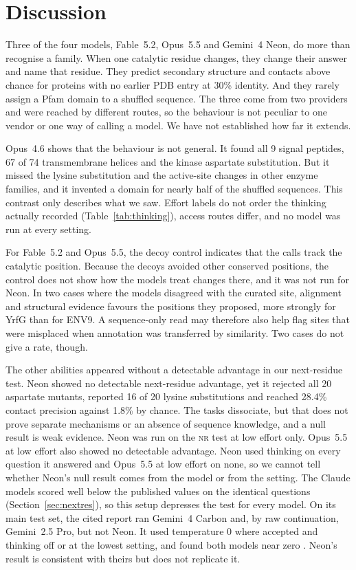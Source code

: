 \documentclass[11pt]{article}
\newcommand{\tnr}{\textmd{\textsc{nr}}}\newcommand{\tfeat}{\textmd{\textsc{feat}}}
\begin{document}
\FloatBarrier
\section{Discussion}

Three of the four models, Fable~5.2, Opus~5.5 and Gemini~4 Neon, do more than recognise a family. When one
catalytic residue changes, they change their answer and name that residue. They predict secondary
structure and contacts above chance for proteins with no earlier PDB entry at 30\% identity. And they
rarely assign a Pfam domain to a shuffled sequence. The three come from two providers and were reached by different
routes, so the behaviour is not peculiar to one vendor or one way of calling a model. We have not
established how far it extends.

Opus~4.6 shows that the behaviour is not general. It found all 9 signal peptides, 67
of 74 transmembrane helices and the kinase aspartate substitution. But it missed the lysine substitution
and the active-site changes in other enzyme families, and it invented a domain for nearly half of the
shuffled sequences. This contrast only describes what we
saw. Effort labels do not order the thinking actually recorded (Table~\ref{tab:thinking}), access routes
differ, and no model was run at every setting.

For Fable~5.2 and Opus~5.5, the decoy control indicates that the calls track the catalytic position.
Because the decoys avoided other conserved positions, the control does not show how the models treat
changes there, and it was not run for Neon. In two cases where the models disagreed with the curated
site, alignment and structural evidence favours the positions they proposed, more strongly for YrfG than
for ENV9. A sequence-only read may therefore also help flag sites that were misplaced when annotation was
transferred by similarity. Two cases do not give a rate, though.

The other abilities appeared without a detectable advantage in our next-residue test. Neon showed no
detectable next-residue advantage, yet it rejected all 20 aspartate mutants, reported 16 of 20 lysine
substitutions and reached 28.4\% contact precision against 1.8\% by chance. The tasks dissociate, but
that does not prove separate mechanisms or an absence of sequence knowledge, and a null result is weak
evidence. Neon was run on the \tnr{} test at low effort only. Opus~5.5 at low effort also showed no detectable
advantage. Neon used thinking on every question it answered and Opus~5.5 at low effort on none, so we
cannot tell whether Neon's null result comes from the model or from the setting. The Claude models
scored well below the published values on the identical questions (Section~\ref{sec:nextres}), so this
setup depresses the test for every model. On its main test set, the cited report ran Gemini~4 Carbon
and, by raw continuation, Gemini~2.5 Pro, but not Neon. It used temperature 0 where accepted and
thinking off or at the lowest setting, and found both models near zero \citep{tu2026claude}. Neon's
result is consistent with theirs but does not replicate it.
\end{document}

